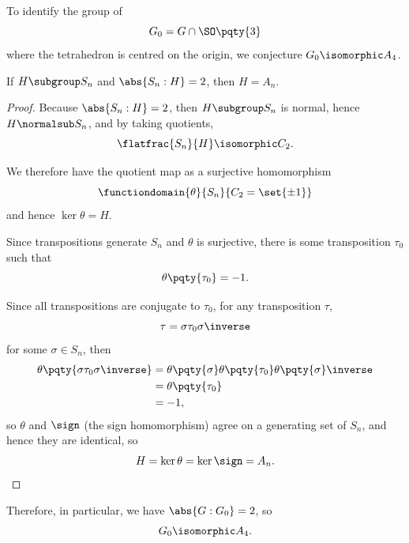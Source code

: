 To identify the group of 
\[
    G_0 = G \cap \SO\pqty{3}
\]
where the tetrahedron is centred on the origin, we conjecture \(G_0 \isomorphic A_4\).

\begin{lemma}
    \label{lem:uniqueness-index-2-subgroup}
    If \(H \subgroup S_n\) and \(\abs{S_n : H} = 2\), then \(H = A_n\).
\end{lemma}

\begin{proof}
    Because \(\abs{S_n : H} = 2\), then \(H \subgroup S_n\) is normal, hence \(H \normalsub S_n\), and by taking quotients,
    \[
        \flatfrac{S_n}{H} \isomorphic C_2.
    \]

    We therefore have the quotient map as a surjective homomorphism
    \[
        \functiondomain{\theta}{S_n}{C_2 = \set{\pm 1}}
    \]
    and hence \(\ker \theta = H\).

    Since transpositions generate \(S_n\) and \(\theta\) is surjective, there is some transposition \(\tau_0\) such that
    \[
        \theta \pqty{\tau_0} = -1.
    \]

    Since all transpositions are conjugate to \(\tau_0\), for any transposition \(\tau\),
    \[
        \tau = \sigma \tau_0 \sigma\inverse
    \]
    for some \(\sigma \in S_n\), then
    \begin{align*}
        \theta \pqty{\sigma \tau_0 \sigma\inverse} &= \theta\pqty{\sigma} \theta\pqty{\tau_0} \theta\pqty{\sigma}\inverse \\
        &= \theta\pqty{\tau_0} \\
        &= -1,
    \end{align*}
    so \(\theta\) and \(\sign\) (the sign homomorphism) agree on a generating set of \(S_n\), and hence they are identical, so
    \[
        H = \ker \theta = \ker \sign = A_n.
    \]
\end{proof}

Therefore, in particular, we have \(\abs{G : G_0} = 2\), so
\[
    G_0 \isomorphic A_4.
\]


